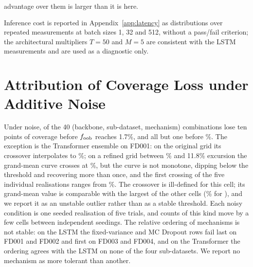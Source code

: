 \documentclass[journal]{IEEEtran}
\begin{document}
advantage over them is larger than it is here.

Inference cost is reported in Appendix~\ref{app:latency} as distributions over repeated measurements at batch sizes 1, 32 and 512, without a pass/fail criterion; the architectural multipliers $T=50$ and $M=5$ are consistent with the LSTM measurements and are used as a diagnostic only.

\section{Attribution of Coverage Loss under Additive Noise}
\label{sec:attribution}
Under noise, \NHalfBelowOneSeven{} of the 40 (backbone, sub-dataset, mechanism) combinations lose ten points of coverage before $f_{\mathrm{oob}}$ reaches 1.7\%, and all but one before \NHalfMaxRest\%. The exception is the Transformer ensemble on FD001: on the original grid its crossover interpolates to \NHalfOutlierVal\%; on a refined grid between \NThrLeftMin\% and 11.8\% excursion the grand-mean curve crosses at \NThrGrand\%, but the curve is not monotone, dipping below the threshold and recovering more than once, and the first crossing of the five individual realisations ranges from \NThrTrial\%. The crossover is ill-defined for this cell; its grand-mean value is comparable with the largest of the other cells (\NHalfMaxRest\% for \NHalfMaxRestCell), and we report it as an unstable outlier rather than as a stable threshold. Each noisy condition is one seeded realisation of five trials, and counts of this kind move by a few cells between independent seedings. The relative ordering of mechanisms is not stable: on the LSTM the fixed-variance and MC Dropout rows fail last on FD001 and FD002 and first on FD003 and FD004, and on the Transformer the ordering agrees with the LSTM on none of the four sub-datasets. We report no mechanism as more tolerant than another.
\end{document}
